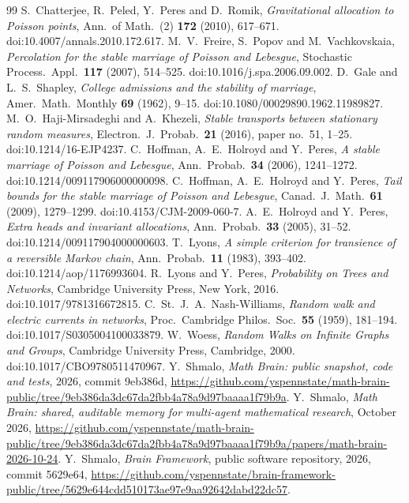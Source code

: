 \documentclass[11pt]{amsart}
\theoremstyle{remark}
\numberwithin{equation}{section}
\begin{document}
\begin{thebibliography}{99}
 S.~Chatterjee, R.~Peled, Y.~Peres and D.~Romik, \emph{Gravitational allocation to Poisson points}, Ann.\ of Math.\ (2) \textbf{172} (2010), 617--671. doi:10.4007/annals.2010.172.617.
 M.~V.~Freire, S.~Popov and M.~Vachkovskaia, \emph{Percolation for the stable marriage of Poisson and Lebesgue}, Stochastic Process.\ Appl.\ \textbf{117} (2007), 514--525. doi:10.1016/j.spa.2006.09.002.
 D.~Gale and L.~S.~Shapley, \emph{College admissions and the stability of marriage}, Amer.\ Math.\ Monthly \textbf{69} (1962), 9--15. doi:10.1080/00029890.1962.11989827.
 M.~O.~Haji-Mirsadeghi and A.~Khezeli, \emph{Stable transports between stationary random measures}, Electron.\ J.\ Probab.\ \textbf{21} (2016), paper no.~51, 1--25. doi:10.1214/16-EJP4237.
 C.~Hoffman, A.~E.~Holroyd and Y.~Peres, \emph{A stable marriage of Poisson and Lebesgue}, Ann.\ Probab.\ \textbf{34} (2006), 1241--1272. doi:10.1214/009117906000000098.
 C.~Hoffman, A.~E.~Holroyd and Y.~Peres, \emph{Tail bounds for the stable marriage of Poisson and Lebesgue}, Canad.\ J.\ Math.\ \textbf{61} (2009), 1279--1299. doi:10.4153/CJM-2009-060-7.
 A.~E.~Holroyd and Y.~Peres, \emph{Extra heads and invariant allocations}, Ann.\ Probab.\ \textbf{33} (2005), 31--52. doi:10.1214/009117904000000603.
 T.~Lyons, \emph{A simple criterion for transience of a reversible Markov chain}, Ann.\ Probab.\ \textbf{11} (1983), 393--402. doi:10.1214/aop/1176993604.
 R.~Lyons and Y.~Peres, \emph{Probability on Trees and Networks}, Cambridge University Press, New York, 2016. doi:10.1017/9781316672815.
 C.~St.~J.~A.~Nash-Williams, \emph{Random walk and electric currents in networks}, Proc.\ Cambridge Philos.\ Soc.\ \textbf{55} (1959), 181--194. doi:10.1017/S0305004100033879.
 W.~Woess, \emph{Random Walks on Infinite Graphs and Groups}, Cambridge University Press, Cambridge, 2000. doi:10.1017/CBO9780511470967.
 Y.~Shmalo, \emph{Math Brain: public snapshot, code and tests}, 2026, commit 9eb386d, \url{https://github.com/yspennstate/math-brain-public/tree/9eb386da3dc67da2fbb4a78a9d97baaaa1f79b9a}.
 Y.~Shmalo, \emph{Math Brain: shared, auditable memory for multi-agent mathematical research}, October 2026, \url{https://github.com/yspennstate/math-brain-public/tree/9eb386da3dc67da2fbb4a78a9d97baaaa1f79b9a/papers/math-brain-2026-10-24}.
 Y.~Shmalo, \emph{Brain Framework}, public software repository, 2026, commit 5629e64, \url{https://github.com/yspennstate/brain-framework-public/tree/5629e644cdd510173ae97e9aa92642dabd22dc57}.
\end{thebibliography}
\end{document}
